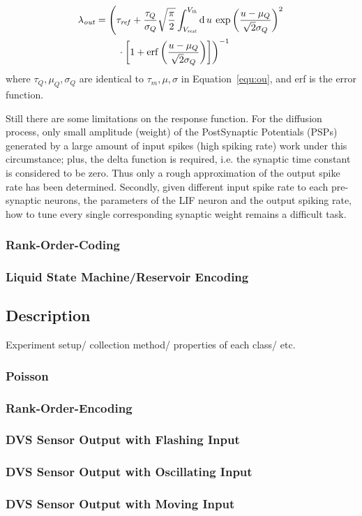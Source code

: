 \begin{align}
\lambda_\mathit{out} &=\left(\tau_\mathit{ref} + \frac{\tau_Q}{\sigma_Q}\sqrt{\frac{\pi}{2}} \int_{V_\mathit{rest}}^{V_\mathit{th}}\mathrm{d}\,u \:\exp \left(\frac{u-\mu_Q}{\sqrt2\sigma_Q} \right )^{2} \right. \nonumber \\
&\qquad \left. \vphantom{\int_t} \cdot  \left[1+\mathrm{erf} \left(\frac{u-\mu_Q}{\sqrt2\sigma_Q} \right ) \right ]\right)^{-1}
\label{equ:sgt}
\end{align}
where $\tau_Q, \mu_Q, \sigma_Q$ are identical to $\tau_m, \mu, \sigma$ in Equation~\ref{equ:ou}, and erf is the error function.

Still there are some limitations on the response function. 
For the diffusion process, only small amplitude (weight) of the PostSynaptic Potentials (PSPs) generated by a large amount of input spikes (high spiking rate) work under this circumstance; 
plus, the delta function is required, i.e. the synaptic time constant is considered to be zero. Thus only a rough approximation of the output spike rate has been determined.
Secondly, given different input spike rate to each pre-synaptic neurons, the parameters of the LIF neuron and the output spiking rate, how to tune every single corresponding synaptic weight remains a difficult task.

\subsubsection{Rank-Order-Coding}

\subsubsection{Liquid State Machine/Reservoir Encoding}

\subsection{Description}
	Experiment setup/ collection method/ properties of each class/ etc.
	\subsubsection{Poisson}
	\subsubsection{Rank-Order-Encoding}
  
	\subsubsection{DVS Sensor Output with Flashing Input}
	\subsubsection{DVS Sensor Output with Oscillating Input}
	\subsubsection{DVS Sensor Output with Moving Input}
	
